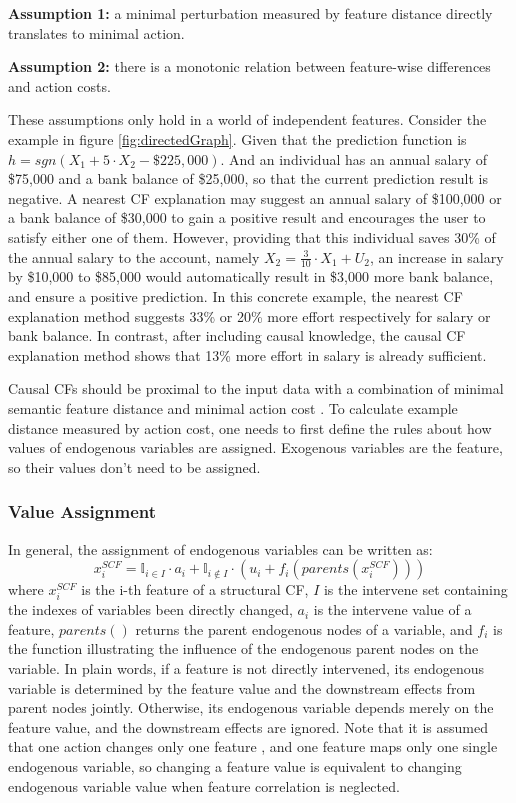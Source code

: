 \noindent \textbf{Assumption 1:} a minimal perturbation measured by feature distance directly translates to minimal action.

\noindent \textbf{Assumption 2:} there is a monotonic relation between feature-wise differences and action costs.

These assumptions only hold in a world of independent features. Consider the example in figure \ref{fig:directedGraph}. Given that the prediction function is $h=sgn(X_1+5\cdot X_2-\$225,000)$. And an individual has an annual salary of \$75,000 and a bank balance of \$25,000, so that the current prediction result is negative. A nearest CF explanation may suggest an annual salary of \$100,000 or a bank balance of \$30,000 to gain a positive result and encourages the user to satisfy either one of them. However, providing that this individual saves 30\% of the annual salary to the account, namely $X_2=\frac{3}{10}\cdot X_1+U_2$, an increase in salary by \$10,000 to \$85,000 would automatically result in \$3,000 more bank balance, and ensure a positive prediction. In this concrete example, the nearest CF explanation method suggests 33\% or 20\% more effort respectively for salary or bank balance. In contrast, after including causal knowledge, the causal CF explanation method shows that 13\% more effort in salary is already sufficient.

Causal CFs should be proximal to the input data with a combination of minimal semantic feature distance and minimal action cost \cite{algorithmicrecourse,preservingCausal}. To calculate example distance measured by action cost, one needs to first define the rules about how values of endogenous variables are assigned. Exogenous variables are the feature, so their values don't need to be assigned.
\subsubsection{Value Assignment} In general, the assignment of endogenous variables can be written as:
\begin{equation}\label{eq:SCM}
  x_i^{SCF}=\mathbb{I}_{i\in I}\cdot a_i+\mathbb{I}_{i\notin I}\cdot(u_i+f_i(parents(x_i^{SCF})))
\end{equation}
where $x_i^{SCF}$ is the i-th feature of a structural CF, $I$ is the intervene set containing the indexes of variables been directly changed, $a_i$ is the intervene value of a feature, $parents()$ returns the parent endogenous nodes of a variable, and $f_i$ is the function illustrating the influence of the endogenous parent nodes on the variable. In plain words, if a feature is not directly intervened, its endogenous variable is determined by the feature value and the downstream effects from parent nodes jointly. Otherwise, its endogenous variable depends merely on the feature value, and the downstream effects are ignored. Note that it is assumed that one action changes only one feature \cite{algorithmicrecourse}, and one feature maps only one single endogenous variable, so changing a feature value is equivalent to changing endogenous variable value when feature correlation is neglected.

